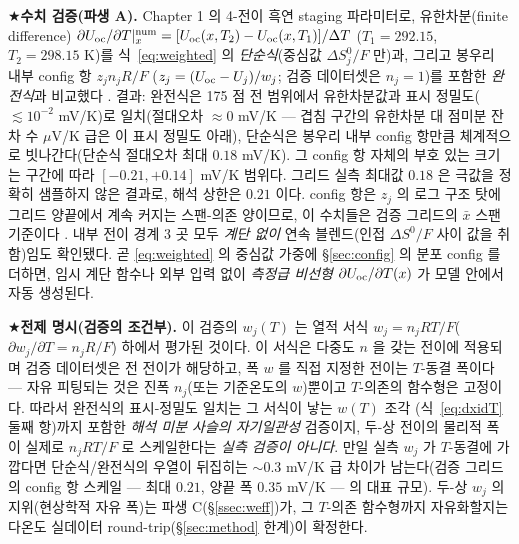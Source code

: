 \begin{srcbox}
★\textbf{수치 검증(파생 A).} Chapter 1 의 4-전이 흑연 staging 파라미터로, 유한차분(finite difference)
$\partial U_{\mathrm{oc}}/\partial T|_x^\mathrm{num}=[U_{\mathrm{oc}}(x,T_2)-U_{\mathrm{oc}}(x,T_1)]/\Delta T$ ($T_1{=}292.15$, $T_2{=}298.15$ K)를
식~\eqref{eq:weighted} 의 \emph{단순식}(중심값 $\Delta S^0_j/F$ 만)과, 그리고 봉우리 내부 config 항 $z_j n_jR/F$
($z_j=(U_{\mathrm{oc}}-U_j)/w_j$; 검증 데이터셋은 $n_j{=}1$)를 포함한 \emph{완전식}과 비교했다 \cite{numverif2026}.
결과: 완전식은 175 점 전 범위에서 유한차분값과 표시 정밀도($\lesssim10^{-2}$ mV/K)로 일치(절대오차 $\approx0$
mV/K --- 겹침 구간의 유한차분 대 점미분 잔차 수 $\mu$V/K 급은 이 표시 정밀도 아래), 단순식은 봉우리 내부
config 항만큼 체계적으로 빗나간다(단순식 절대오차 최대 $0.18$ mV/K). 그 config 항 자체의 부호 있는 크기는
구간에 따라 $[-0.21,+0.14]$ mV/K 범위다. 그리드 실측 최대값 $0.18$ 은 극값을 정확히 샘플하지 않은 결과로,
해석 상한은 $0.21$ 이다. config 항은 $z_j$ 의 로그 구조 탓에 그리드 양끝에서 계속 커지는 스팬-의존 양이므로,
이 수치들은 검증 그리드의 $\bar x$ 스팬 기준이다 \cite{numverif2026}. 내부 전이 경계 3 곳 모두 \emph{계단 없이}
연속 블렌드(인접 $\Delta S^0/F$ 사이 값을 취함)임도 확인됐다. 곧 \eqref{eq:weighted} 의 중심값 가중에
\S\ref{sec:config} 의 분포 config 를 더하면, 임시 계단 함수나 외부 입력 없이 \emph{측정급 비선형}
$\partial U_{\mathrm{oc}}/\partial T(x)$ 가 모델 안에서 자동 생성된다.

★\textbf{전제 명시(검증의 조건부).} 이 검증의 $w_j(T)$ 는 열적 서식 $w_j=n_jRT/F$($\partial
w_j/\partial T=n_jR/F$) 하에서 평가된 것이다. 이 서식은 다중도 $n$ 을 갖는 전이에 적용되며 검증 데이터셋은 전
전이가 해당하고, 폭 $w$ 를 직접 지정한 전이는 $T$-동결 폭이다 --- 자유 피팅되는 것은 진폭 $n_j$(또는 기준온도의
$w$)뿐이고 $T$-의존의 함수형은 고정이다. 따라서 완전식의 표시-정밀도 일치는 그 서식이 낳는 $w(T)$ 조각
(식~\eqref{eq:dxidT} 둘째 항)까지 포함한 \emph{해석 미분 사슬의 자기일관성} 검증이지, 두-상 전이의 물리적 폭이
실제로 $n_jRT/F$ 로 스케일한다는 \emph{실측 검증이 아니다}. 만일 실측 $w_j$ 가 $T$-동결에 가깝다면 단순식/완전식의
우열이 뒤집히는 $\sim$0.3 mV/K 급 차이가 남는다(검증 그리드의 config 항 스케일 --- 최대 $0.21$, 양끝 폭 $0.35$
mV/K --- 의 대표 규모). 두-상 $w_j$ 의 지위(현상학적 자유 폭)는 파생 C(\S\ref{ssec:weff})가, 그 $T$-의존
함수형까지 자유화할지는 다온도 실데이터 round-trip(\S\ref{sec:method} 한계)이 확정한다.
\end{srcbox}


